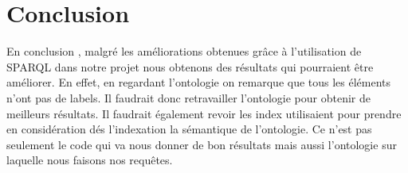 \documentclass{article}
\begin{document}
\section{Conclusion}

En conclusion , malgré les améliorations obtenues grâce à l’utilisation de SPARQL
dans notre projet nous obtenons des résultats qui pourraient être améliorer. En
effet, en regardant l’ontologie on remarque que tous les éléments n’ont pas de
labels. Il faudrait donc retravailler l’ontologie pour obtenir de meilleurs
résultats. Il faudrait également revoir les index utilisaient pour prendre en
considération dés l'indexation la sémantique de l’ontologie. Ce n’est pas seulement
le code qui va nous donner de bon résultats mais aussi l’ontologie sur laquelle nous
faisons nos requêtes. 
\end{document}
